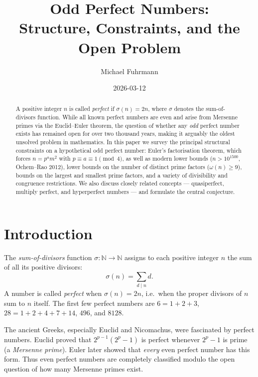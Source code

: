 \documentclass[12pt,a4paper]{amsart}
\theoremstyle{definition}
\theoremstyle{remark}
\newcommand{\N}{\mathbb{N}}
\begin{document}
\title{Odd Perfect Numbers:\\
Structure, Constraints, and the Open Problem}

\author{Michael Fuhrmann}
\address{Specialist Mathematics Project, Build 168}
\date{2026-03-12}

\begin{abstract}
A positive integer $n$ is called \emph{perfect} if $\sigma(n) = 2n$,
where $\sigma$ denotes the sum-of-divisors function.
While all known perfect numbers are even and arise from Mersenne primes via
the Euclid--Euler theorem, the question of whether any \emph{odd} perfect
number exists has remained open for over two thousand years, making it
arguably the oldest unsolved problem in mathematics.
In this paper we survey the principal structural constraints on a hypothetical
odd perfect number: Euler's factorisation theorem, which forces $n = p^a m^2$
with $p \equiv a \equiv 1 \pmod{4}$, as well as modern lower bounds
($n > 10^{1500}$, Ochem--Rao 2012), lower bounds on the number of distinct
prime factors ($\omega(n) \geq 9$), bounds on the largest and smallest prime
factors, and a variety of divisibility and congruence restrictions.
We also discuss closely related concepts --- quasiperfect, multiply perfect,
and hyperperfect numbers --- and formulate the central conjecture.
\end{abstract}

\maketitle

\tableofcontents

\section{Introduction}

The \emph{sum-of-divisors} function $\sigma : \N \to \N$ assigns to each
positive integer $n$ the sum of all its positive divisors:
\[
  \sigma(n) = \sum_{d \mid n} d.
\]
A number is called \emph{perfect} when $\sigma(n) = 2n$, i.e.\ when the
proper divisors of $n$ sum to $n$ itself.
The first few perfect numbers are $6 = 1+2+3$,
$28 = 1+2+4+7+14$,
$496$, and $8128$.

The ancient Greeks, especially Euclid and Nicomachus, were fascinated by
perfect numbers.
Euclid proved that $2^{p-1}(2^p-1)$ is perfect whenever $2^p - 1$ is prime
(a \emph{Mersenne prime}).
Euler later showed that \emph{every} even perfect number has this form.
Thus even perfect numbers are completely classified modulo the open question
of how many Mersenne primes exist.
\end{document}
